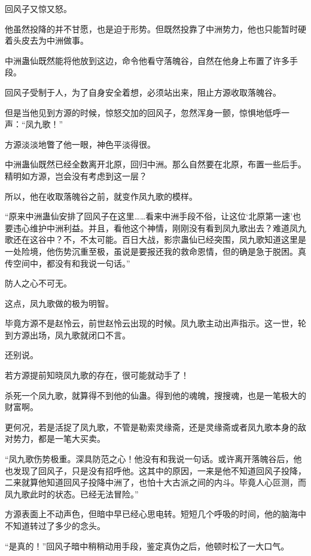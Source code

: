 
\begin{this_body}

回风子又惊又怒。

他虽然投降的并不甘愿，也是迫于形势。但既然投靠了中洲势力，他也只能暂时硬着头皮去为中洲做事。

中洲蛊仙既然能将他放到这边，命令他看守落魄谷，自然在他身上布置了许多手段。

回风子受制于人，为了自身安全着想，必须站出来，阻止方源收取落魄谷。

但是当他见到方源的时候，惊怒交加的回风子，忽然浑身一颤，惊惧地低呼一声：“凤九歌！”

方源淡淡地瞥了他一眼，神色平淡得很。

中洲蛊仙既然已经全数离开北原，回归中洲。那么自然要在北原，布置一些后手。精明如方源，岂会没有考虑到这一层？

所以，他在收取落魄谷之前，就变作凤九歌的模样。

“原来中洲蛊仙安排了回风子在这里……看来中洲手段不俗，让这位‘北原第一速’也要违心维护中洲利益。并且，看他这个神情，刚刚没有看到凤九歌出去？难道凤九歌还在这谷中？不，不太可能。百日大战，影宗蛊仙已经突围，凤九歌知道这里是一处险境，他伤势沉重至极，虽说是要报还我的救命恩情，但的确是急于脱困。真传空间中，都没有和我说一句话。”

防人之心不可无。

这点，凤九歌做的极为明智。

毕竟方源不是赵怜云，前世赵怜云出现的时候。凤九歌主动出声指示。这一世，轮到方源出场，凤九歌就闭口不言。

还别说。

若方源提前知晓凤九歌的存在，很可能就动手了！

杀死一个凤九歌，就算得不到他的仙蛊。得到他的魂魄，搜搜魂，也是一笔极大的财富啊。

更何况，若是活捉了凤九歌，不管是勒索灵缘斋，还是灵缘斋或者凤九歌本身的敌对势力，都是一笔大买卖。

“凤九歌伤势极重。深具防范之心！他没有和我说一句话。或许离开落魄谷后，他也发现了回风子，只是没有招呼他。这其中的原因，一来是他不知道回风子投降，二来就算他知道回风子投降中洲了，也怕十大古派之间的内斗。毕竟人心叵测，而凤九歌此时的状态。已经无法冒险。”

方源表面上不动声色，但暗中早已经心思电转。短短几个呼吸的时间，他的脑海中不知道转过了多少的念头。

“是真的！”回风子暗中稍稍动用手段，鉴定真伪之后，他顿时松了一大口气。


\end{this_body}
